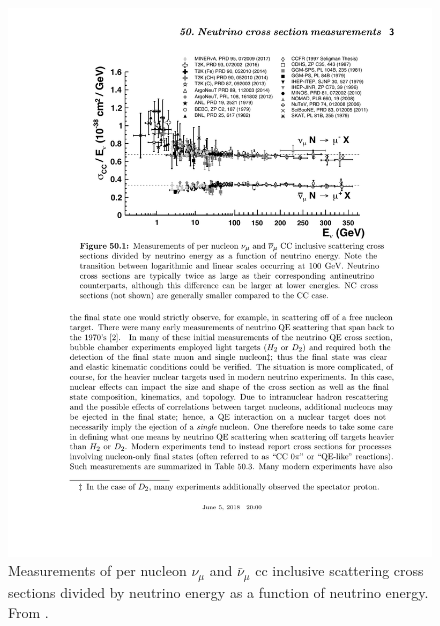 \begin{figure}[t]
\centering
\includegraphics[width=1.0\textwidth]{images/NeutrinoInteractions/pdg_cross_sections}
\caption[Measurements of $\nu_\mu$ and $\bar{\nu}_\mu$ Charged Current Inclusive Scattering]{Measurements of per nucleon $\nu_\mu$ and $\bar{\nu}_\mu$ \acrshort{cc} inclusive scattering cross sections divided by neutrino energy as a function of neutrino energy. From \cite{PDGReview}.}
\label{fig:pdg_cross_sections}
\end{figure}

















